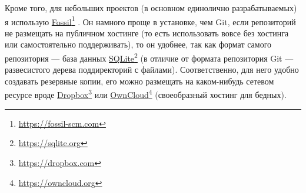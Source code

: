 \documentclass[a4paper,12pt]{article}
\newcommand\foothref[2]{%
  \href{#1}{#2}\footnote{\url{#1}}%
}
\begin{document}
Кроме того, для небольших проектов (в основном единолично разрабатываемых) я использую
\foothref{https://fossil-scm.com}{Fossil}. Он намного проще в установке, чем Git,
если репозиторий не размещать на публичном хостинге (то есть использовать вовсе без
хостинга или самостоятельно поддерживать), то он удобнее, так как формат самого
репозитория --- база данных \foothref{https://sqlite.org}{SQLite} (в отличие от
формата репозитория Git --- развесистого дерева поддиректорий с файлами). Соответственно,
для него удобно создавать резервные копии, его можно размещать на каком-нибудь сетевом
ресурсе вроде \foothref{https://dropbox.com}{Dropbox} или
\foothref{https://owncloud.org}{OwnCloud} (своеобразный хостинг для бедных).
\end{document}
